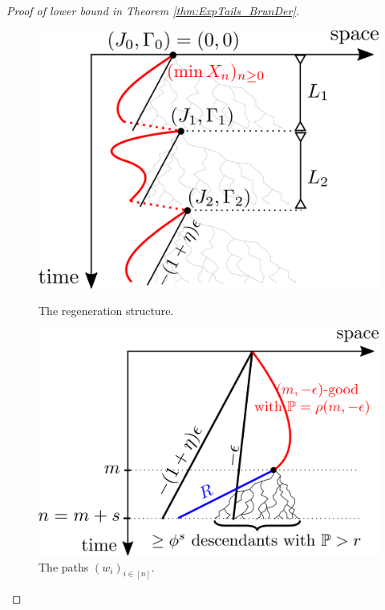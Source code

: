 \begin{proof}[Proof of lower bound in Theorem \ref{thm:ExpTails_BrunDer}]
\begin{figure}[!h]
\centering
\begin{minipage}{0.45\textwidth}
  \centering
  \includegraphics[width=\linewidth]{graphics/g4}
  \caption{The regeneration structure. }
  \label{fig:regen_structure}
\end{minipage}
\begin{minipage}{0.45\textwidth}
  \centering
  \includegraphics[width=\linewidth]{graphics/g3}
  \caption{The paths $(w_i)_{i \in [n]}$. }
  \label{fig:weird_constant_choice}
\end{minipage}\hfill%
\end{figure}



\end{proof}
